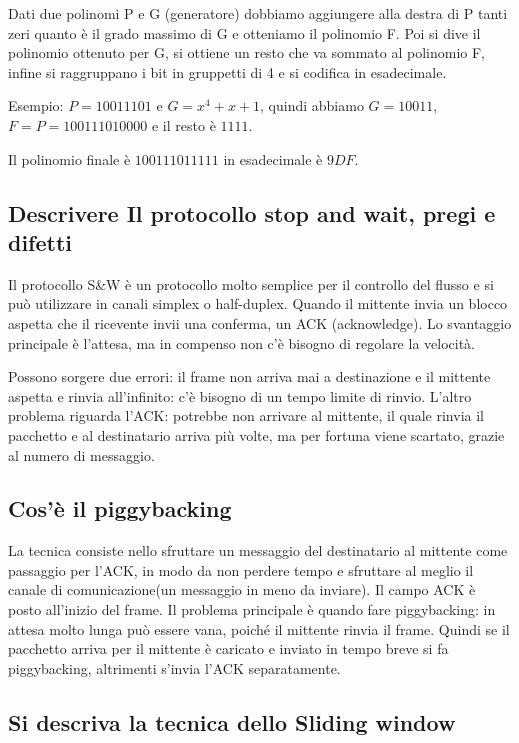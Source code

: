 Dati due polinomi P e G (generatore) dobbiamo aggiungere alla destra di P tanti zeri quanto è il
grado massimo di G e otteniamo il polinomio F. Poi si dive il polinomio ottenuto per G, si ottiene un resto che va sommato al polinomio F, infine si raggruppano i bit in gruppetti di 4 e si codifica in esadecimale.

Esempio: $P=10011101$ e $G= x^4+x+1$, quindi abbiamo $G=10011$, $F= P=100111010000$ e il resto è $1111$.

Il polinomio finale è $1001 1101 1111$ in esadecimale è $9DF$.

\subsection{Descrivere Il protocollo stop and wait, pregi e difetti}

Il protocollo S\&W è un protocollo molto semplice per il controllo del flusso e si può utilizzare in
canali simplex o half-duplex. Quando il mittente invia un blocco aspetta che il ricevente invii una
conferma, un ACK (acknowledge). Lo svantaggio principale è l'attesa, ma in compenso non c'è
bisogno di regolare la velocità.

Possono sorgere due errori: il frame non arriva mai a destinazione e il mittente aspetta e rinvia
all'infinito: c'è bisogno di un tempo limite di rinvio. L'altro problema riguarda l'ACK: potrebbe non arrivare al mittente, il quale rinvia il pacchetto e al destinatario arriva più volte, ma per fortuna viene scartato, grazie al numero di messaggio.

\subsection{Cos’è il piggybacking}

La tecnica consiste nello sfruttare un messaggio del destinatario al mittente come passaggio per
l’ACK, in modo da non perdere tempo e sfruttare al meglio il canale di comunicazione(un messaggio
in meno da inviare). Il campo ACK è posto all’inizio del frame. Il problema principale è quando fare
piggybacking: in attesa molto lunga può essere vana, poiché il mittente rinvia il frame. Quindi se il pacchetto arriva per il mittente è caricato e inviato in tempo breve si fa piggybacking, altrimenti s’invia l’ACK separatamente.

\subsection{Si descriva la tecnica dello Sliding window}

